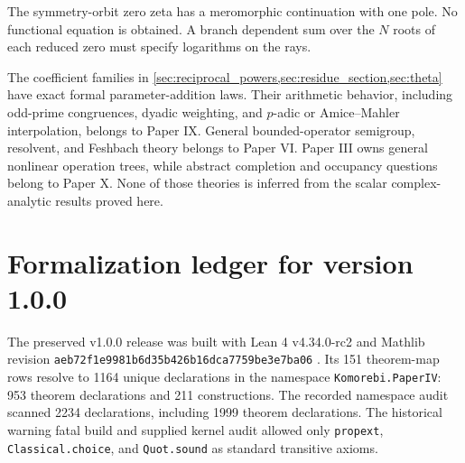 \documentclass[11pt,letterpaper]{article}
\theoremstyle{definition}
\theoremstyle{remark}
\newcommand{\leanname}[1]{\nolinkurl{#1}}
\begin{document}
The symmetry-orbit zero zeta has a meromorphic continuation with one pole. No
functional equation is obtained. A branch dependent sum over the $N$ roots of
each reduced zero must specify logarithms on the rays.

The coefficient families in
\cref{sec:reciprocal_powers,sec:residue_section,sec:theta} have exact formal
parameter-addition laws. Their arithmetic behavior, including odd-prime
congruences, dyadic weighting, and $p$-adic or Amice--Mahler interpolation,
belongs to Paper IX. General bounded-operator semigroup, resolvent, and
Feshbach theory belongs to Paper VI. Paper III owns general nonlinear
operation trees, while abstract completion and occupancy questions belong to
Paper X. None of those theories is inferred from the scalar complex-analytic
results proved here.

\section{Formalization ledger for version 1.0.0}\label{sec:formalization_ledger}

The preserved v1.0.0 release was built with Lean 4 v4.34.0-rc2 and Mathlib revision
\leanname{aeb72f1e9981b6d35b426b16dca7759be3e7ba06}
\cite{deMouraUllrich2021,mathlib2020}. Its 151 theorem-map rows resolve to
1164 unique declarations in the namespace \leanname{Komorebi.PaperIV}:
953 theorem declarations and 211 constructions. The recorded namespace audit scanned
2234 declarations, including 1999 theorem declarations. The historical warning fatal
build and supplied kernel audit allowed only
\leanname{propext}, \leanname{Classical.choice}, and
\leanname{Quot.sound} as standard transitive axioms.
\end{document}
